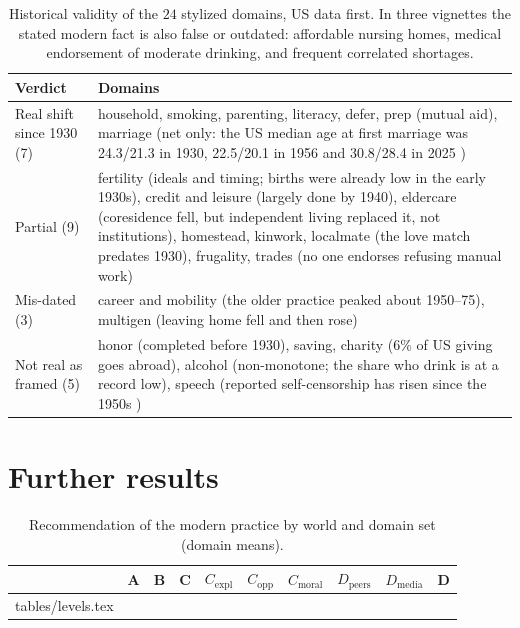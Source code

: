 \documentclass[11pt]{article}
\makeatletter
\newcommand{\tabinput}[1]{\@@input #1 }%
\makeatother
\begin{document}
\begin{table}[h]
\centering\footnotesize
\begin{tabularx}{\linewidth}{@{}l>{\raggedright\arraybackslash}X@{}}
\toprule
Verdict & Domains \\
\midrule
Real shift since 1930 (7) & household, smoking, parenting, literacy, defer, prep (mutual aid), marriage (net only: the US median age at first marriage was 24.3/21.3 in 1930, 22.5/20.1 in 1956 and 30.8/28.4 in 2025 \cite{census2025marriage}) \\
Partial (9) & fertility (ideals and timing; births were already low in the early 1930s), credit and leisure (largely done by 1940), eldercare (coresidence fell, but independent living replaced it, not institutions), homestead, kinwork, localmate (the love match predates 1930), frugality, trades (no one endorses refusing manual work) \\
Mis-dated (3) & career and mobility (the older practice peaked about 1950--75), multigen (leaving home fell and then rose) \\
Not real as framed (5) & honor (completed before 1930), saving, charity (6\% of US giving goes abroad), alcohol (non-monotone; the share who drink is at a record low), speech (reported self-censorship has risen since the 1950s \cite{gibson2023keeping}) \\
\bottomrule
\end{tabularx}
\caption{Historical validity of the $24$ stylized domains, US data first. In three vignettes the stated modern fact is also false or outdated: affordable nursing homes, medical endorsement of moderate drinking, and frequent correlated shortages.}
\label{tab:validity}
\end{table}

\clearpage
\section{Further results}
\label{app:results}

\begin{table}[h]
\centering\footnotesize
\setlength{\tabcolsep}{3.5pt}
\begin{tabular}{@{}lccccccccc@{}}
\toprule
 & A & B & C & $C_{\text{expl}}$ & $C_{\text{opp}}$ & $C_{\text{moral}}$ & $D_{\text{peers}}$ & $D_{\text{media}}$ & D \\
\midrule
\tabinput{tables/levels.tex}
\bottomrule
\end{tabular}
\caption{Recommendation of the modern practice by world and domain set (domain means).}
\label{tab:levels}
\end{table}
\end{document}
